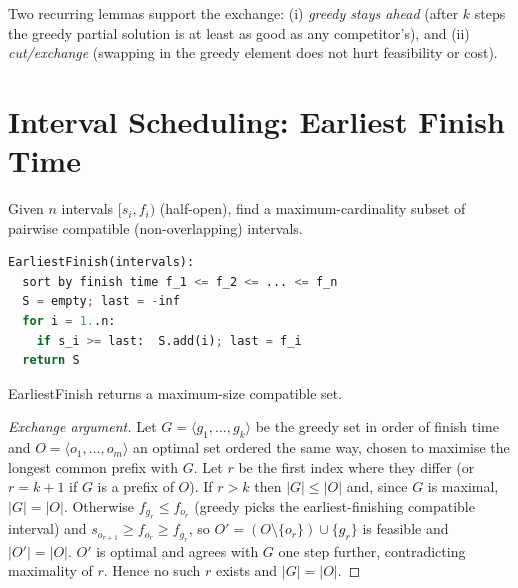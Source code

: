\begin{center}
\end{center}

Two recurring lemmas support the exchange: (i) \emph{greedy stays ahead} (after $k$ steps the greedy partial solution is at least as good as any competitor's), and (ii) \emph{cut/exchange} (swapping in the greedy element does not hurt feasibility or cost).

\section{Interval Scheduling: Earliest Finish Time}
\label{sec:interval-scheduling}

Given $n$ intervals $[s_i,f_i)$ (half-open), find a maximum-cardinality subset of pairwise compatible (non-overlapping) intervals.

\begin{lstlisting}[language=Python]
EarliestFinish(intervals):
  sort by finish time f_1 <= f_2 <= ... <= f_n
  S = empty; last = -inf
  for i = 1..n:
    if s_i >= last:  S.add(i); last = f_i
  return S
\end{lstlisting}

\begin{theorem}
EarliestFinish returns a maximum-size compatible set.
\end{theorem}
\begin{proof}[Exchange argument]
Let $G=\langle g_1,\dots,g_k\rangle$ be the greedy set in order of finish time and $O=\langle o_1,\dots,o_m\rangle$ an optimal set ordered the same way, chosen to maximise the longest common prefix with $G$. Let $r$ be the first index where they differ (or $r=k+1$ if $G$ is a prefix of $O$). If $r>k$ then $|G|\le|O|$ and, since $G$ is maximal, $|G|=|O|$. Otherwise $f_{g_r}\le f_{o_r}$ (greedy picks the earliest-finishing compatible interval) and $s_{o_{r+1}}\ge f_{o_r}\ge f_{g_r}$, so $O'=(O\setminus\{o_r\})\cup\{g_r\}$ is feasible and $|O'|=|O|$. $O'$ is optimal and agrees with $G$ one step further, contradicting maximality of $r$. Hence no such $r$ exists and $|G|=|O|$.
\end{proof}


